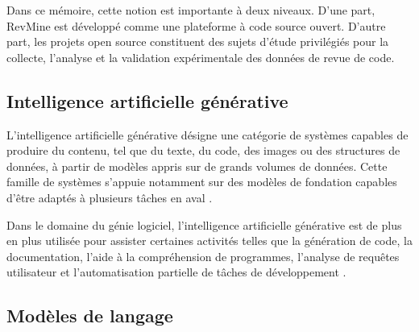 




Dans ce mémoire, cette notion est importante à deux niveaux. D’une part, RevMine est développé comme une plateforme à code source ouvert. D’autre part, les projets open source constituent des sujets d’étude privilégiés pour la collecte, l’analyse et la validation expérimentale des données de revue de code.

\subsection{Intelligence artificielle générative}

L’intelligence artificielle générative désigne une catégorie de systèmes capables de produire du contenu, tel que du texte, du code, des images ou des structures de données, à partir de modèles appris sur de grands volumes de données. Cette famille de systèmes s’appuie notamment sur des modèles de fondation capables d’être adaptés à plusieurs tâches en aval \cite{bommasani2021foundation}.

Dans le domaine du génie logiciel, l’intelligence artificielle générative est de plus en plus utilisée pour assister certaines activités telles que la génération de code, la documentation, l’aide à la compréhension de programmes, l’analyse de requêtes utilisateur et l’automatisation partielle de tâches de développement \cite{hou2024llmse}.

\subsection{Modèles de langage}

